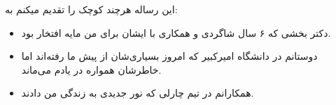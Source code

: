 \begin{acknowledgementpage}

\vspace{1.5cm}

{\nastaliq
{
    این رساله هرچند کوچک را تقدیم میکنم به:

    \begin{itemize}
        \item دکتر بخشی که ۶ سال شاگردی و همکاری با ایشان برای من مایه افتخار بود.
        \item دوستانم در دانشگاه امیرکبیر که امروز بسیاری‌شان از پیش ما رفته‌اند اما خاطرشان همواره در یادم می‌ماند.
        \item همکارانم در تیم چارلی که نور جدیدی به زندگی من دادند.
    \end{itemize}
}}\end{acknowledgementpage}
\newpage